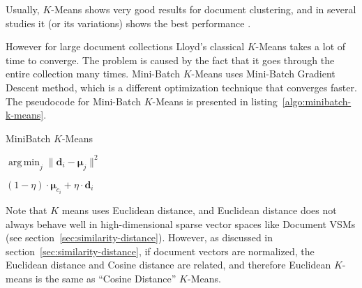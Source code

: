 Usually, $K$-Means shows very good results for document clustering, and in
several studies it (or its variations) shows the best performance \cite{hall2012evaluating} \cite{steinbach2000comparison}.

However for large document collections Lloyd's classical $K$-Means takes a lot
of time to converge. The problem is caused by the fact that it goes through
the entire collection many times. Mini-Batch $K$-Means \cite{sculley2010web}
uses Mini-Batch Gradient Descent method, which is a different optimization technique
that converges faster. The pseudocode for Mini-Batch $K$-Means is presented
in listing~\ref{algo:minibatch-k-means}.

\begin{algorithm}
\caption{MiniBatch $K$-Means}
\label{algo:minibatch-k-means}

\begin{algorithmic}[0]
  \Statex
     
    \EndFor


            {$\operatorname{arg\, min}_j \| \mathbf d_i - \boldsymbol \mu_j \|^2$}
      \EndFor

           
             
        {$(1 - \eta) \cdot \boldsymbol \mu_{c_i} + \eta \cdot \mathbf d_i$}
      \EndFor

    \State {}
  \EndFunction
\end{algorithmic}
\end{algorithm}


Note that $K$ means uses Euclidean distance, and Euclidean distance
does not always behave well in high-dimensional sparse vector spaces
like Document VSMs (see section~\ref{sec:similarity-distance}). However,
as discussed in section~\ref{sec:similarity-distance},
if document vectors are normalized, the Euclidean distance
and Cosine distance are related, and therefore
Euclidean $K$-means is the same as ``Cosine Distance'' $K$-Means.

